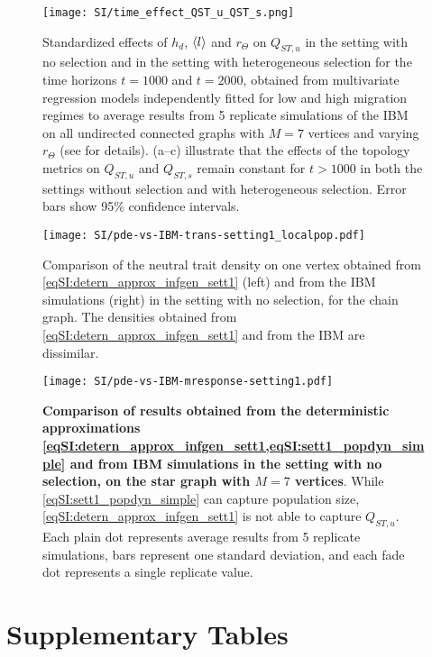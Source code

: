 \begin{figure}[ht]
  \centering
    \texttt{[image: SI/time\_effect\_QST\_u\_QST\_s.png]}
    \caption{Standardized effects of $h_d$, $\langle l \rangle$ and $r_\Theta$ on $Q_{ST,u}$ in the setting with no selection and in the setting with heterogeneous selection for the time horizons $t=1000$ and $t=2000$, obtained from multivariate regression models independently fitted for low and high migration regimes to average results from 5 replicate simulations of the IBM on all undirected connected graphs with $M=7$ vertices and varying $r_\Theta$ (see  for details). (a--c) illustrate that the effects of the topology metrics on $Q_{ST,u}$ and  $Q_{ST,s}$ remain constant for $t > 1000$ in both the settings without selection and with heterogeneous selection. Error bars show 95\% confidence intervals. }\label{time_effect_Q_ST_u}
\end{figure}

\begin{figure}[ht]
  \centering
      \texttt{[image: SI/pde-vs-IBM-trans-setting1\_localpop.pdf]}
    \caption{ Comparison of the neutral trait density on one vertex obtained from \cref{eqSI:detern_approx_infgen_sett1} (left) and from the IBM simulations (right) in the setting with no selection, for the chain graph. The densities obtained from \cref{eqSI:detern_approx_infgen_sett1} and from the IBM are dissimilar.}
    \label{figSI:pde-vs-IBM-trans-setting1_localpop}
  \end{figure}

\begin{figure}[ht]
  \centering
    \texttt{[image: SI/pde-vs-IBM-mresponse-setting1.pdf]} 
    \caption{\textbf{Comparison of results obtained from the deterministic approximations \cref{eqSI:detern_approx_infgen_sett1,eqSI:sett1_popdyn_simple} and from IBM simulations in the setting with no selection, on the star graph with $M=7$ vertices}. While \cref{eqSI:sett1_popdyn_simple} can capture population size, \cref{eqSI:detern_approx_infgen_sett1} is not able to capture $Q_{ST,u}$. Each plain dot represents average results from 5 replicate simulations, bars represent one standard deviation, and each fade dot represents a single replicate value.
    }
    \label{figSI:pde-vs-IBM-mresponse-setting1}
\end{figure}
\clearpage

\section{Supplementary Tables}

